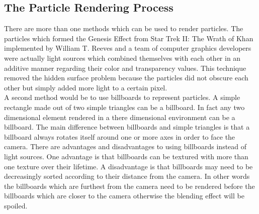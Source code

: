 \newpage
\subsection{The Particle Rendering Process}
There are more than one methods which can be used to render particles. The particles which formed the Genesis Effect from Star Trek II: The Wrath of Khan implemented by William T. Reeves and a team of computer graphics developers were actually light sources which combined themselves with each other in an additive manner regarding their color and transparency values. This technique removed the hidden surface problem because the particles did not obscure each other but simply added more light to a certain pixel.\\

A second method would be to use billboards to represent particles. A simple rectangle made out of two simple triangles can be a billboard. In fact any two dimensional element rendered in a there dimensional environment can be a billboard. The main difference between billboards and simple triangles is that a billboard always rotates itself around one or more axes in order to face the camera. There are advantages and disadvantages to using billboards instead of light sources. One advantage is that billboards can be textured with more than one texture over their lifetime. A disadvantage is that billboards may need to be decreasingly sorted according to their distance from the camera. In other words the billboards which are furthest from the camera need to be rendered before the billboards which are closer to the camera otherwise the blending effect will be spoiled.\\